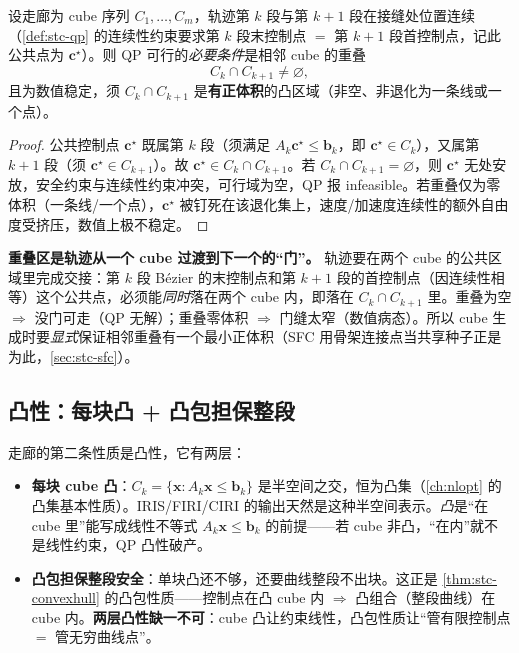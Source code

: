 \begin{theorem}[走廊连续性条件]\label{thm:stc-overlap}
设走廊为 cube 序列 $C_1,\dots,C_m$，轨迹第 $k$ 段与第 $k+1$ 段在接缝处位置连续（\cref{def:stc-qp} 的连续性约束要求第 $k$ 段末控制点 $=$ 第 $k+1$ 段首控制点，记此公共点为 $\mathbf{c}^\star$）。则 QP 可行的\emph{必要条件}是相邻 cube 的重叠
\begin{equation}
  C_k\cap C_{k+1}\neq\varnothing,
  \label{eq:stc-overlap}
\end{equation}
且为数值稳定，须 $C_k\cap C_{k+1}$ 是\textbf{有正体积}的凸区域（非空、非退化为一条线或一个点）。
\end{theorem}
\begin{proof}
公共控制点 $\mathbf{c}^\star$ 既属第 $k$ 段（须满足 $A_k\mathbf{c}^\star\le\mathbf{b}_k$，即 $\mathbf{c}^\star\in C_k$），又属第 $k+1$ 段（须 $\mathbf{c}^\star\in C_{k+1}$）。故 $\mathbf{c}^\star\in C_k\cap C_{k+1}$。若 $C_k\cap C_{k+1}=\varnothing$，则 $\mathbf{c}^\star$ 无处安放，安全约束与连续性约束冲突，可行域为空，QP 报 infeasible。若重叠仅为零体积（一条线/一个点），$\mathbf{c}^\star$ 被钉死在该退化集上，速度/加速度连续性的额外自由度受挤压，数值上极不稳定。
\end{proof}

\begin{insight}
\textbf{重叠区是轨迹从一个 cube 过渡到下一个的“门”。}\;
轨迹要在两个 cube 的公共区域里完成交接：第 $k$ 段 Bézier 的末控制点和第 $k+1$ 段的首控制点（因连续性相等）这个公共点，必须能\emph{同时}落在两个 cube 内，即落在 $C_k\cap C_{k+1}$ 里。重叠为空 $\Rightarrow$ 没门可走（QP 无解）；重叠零体积 $\Rightarrow$ 门缝太窄（数值病态）。所以 cube 生成时要\emph{显式}保证相邻重叠有一个最小正体积（SFC 用骨架连接点当共享种子正是为此，\cref{sec:stc-sfc}）。
\end{insight}

\subsection{凸性：每块凸 + 凸包担保整段}
\label{sec:stc-convexity}

走廊的第二条性质是凸性，它有两层：
\begin{itemize}
  \item \textbf{每块 cube 凸}：$C_k=\{\mathbf{x}:A_k\mathbf{x}\le\mathbf{b}_k\}$ 是半空间之交，恒为凸集（\cref{ch:nlopt} 的凸集基本性质）。IRIS/FIRI/CIRI 的输出天然是这种半空间表示。\emph{凸}是“在 cube 里”能写成线性不等式 $A_k\mathbf{x}\le\mathbf{b}_k$ 的前提——若 cube 非凸，“在内”就不是线性约束，QP 凸性破产。
  \item \textbf{凸包担保整段安全}：单块凸还不够，还要曲线整段不出块。这正是 \cref{thm:stc-convexhull} 的凸包性质——控制点在凸 cube 内 $\Rightarrow$ 凸组合（整段曲线）在 cube 内。\textbf{两层凸性缺一不可}：cube 凸让约束线性，凸包性质让“管有限控制点 $=$ 管无穷曲线点”。
\end{itemize}

